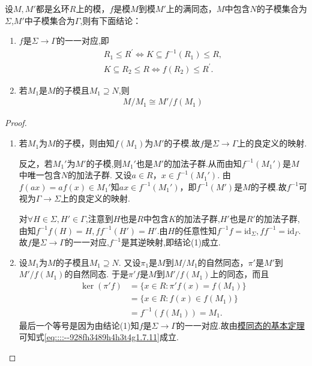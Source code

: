\documentclass[../../main.tex]{subfiles}%
\begin{document}
\begin{theorem}\label{theorem:模同态的基本定理推论}
设$M, M'$都是幺环$R$上的模，$f$是模$M$到模$M'$上的满同态，$M$中包含$N$的子模集合为$\Sigma$,$M'$中子模集合为$\Gamma$,则有下面结论：
\begin{enumerate}[(1)]
\item\label{theorem:模同态的基本定理推论-1} $f$是$\Sigma\to \Gamma$的一一对应,即
\begin{gather*}
R_1\leqslant R^{\prime}\Longleftrightarrow K\subseteq f^{-1}\left( R_1 \right) \leqslant R,
\\
K\subseteq R_2\leqslant R\Longleftrightarrow f\left( R_2 \right) \leqslant R^{\prime}.
\end{gather*}

\item\label{theorem:模同态的基本定理-3} 若$M_1$是$M$的子模且$M_1 \supseteq N$,则
\begin{align}
M/M_1 \cong M'/f(M_1) \label{eq::::--928fh3489h4h3t4g1.7.11}
\end{align}
\end{enumerate}
\end{theorem}
\begin{proof}
\begin{enumerate}[(1)]
\item 若$M_1$为$M$的子模，则由知$f(M_1)$为$M'$的子模.故$f$是$\Sigma\to \Gamma$上的良定义的映射.

反之，若$M_1'$为$M'$的子模,则$M_1'$也是$M'$的加法子群.从而由知$f^{-1}(M_1')$是$M$中唯一包含$N$的加法子群. 又设$a \in R$，$x \in f^{-1}(M_1')$. 由$f(ax) = af(x) \in M_1'$知$ax \in f^{-1}(M_1')$，即$f^{-1}(M')$是$M$的子模.故$f^{-1}$可视为$\Gamma\to \Sigma$上的良定义的映射. 

对$\forall H\in \Sigma,H'\in \Gamma$,注意到$H$也是$R$中包含$K$的加法子群,$H'$也是$R'$的加法子群,由知$f^{-1}f(H)=H,ff^{-1}(H')=H'.$由$H$的任意性知$f^{-1}f=\mathrm{id}_{\Sigma},ff^{-1}=\mathrm{id}_{\Gamma}.$故$f$是$\Sigma\to \Gamma$的一一对应,$f^{-1}$是其逆映射,即结论(1)成立.

\item 设$M_1$为$M$的子模且$M_1 \supseteq N$. 又设$\pi_1$是$M$到$M/M_1$的自然同态，$\pi'$是$M'$到$M'/f(M_1)$的自然同态. 于是$\pi' f$是$M$到$M'/f(M_1)$上的同态，而且
\begin{align*}
\ker(\pi' f) &= \{ x \in R : \pi' f(x) = f(M_1) \} \\
&= \{ x \in R : f(x) \in f(M_1) \} \\
&= f^{-1}(f(M_1)) =  M_1.
\end{align*}
最后一个等号是因为由结论(1)知$f$是$\Sigma \rightarrow \Gamma$的一一对应.故由\hyperref[theorem:模同态的基本定理]{模同态的基本定理}可知式\eqref{eq::::--928fh3489h4h3t4g1.7.11}成立.
\end{enumerate}
\end{proof}
\end{document}
